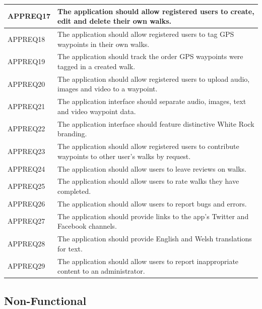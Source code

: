 \documentclass[11pt,a4paper]{article}
\begin{document}
\begin{longtable}{|p{2.5cm}p{13cm}|}
APPREQ17 & The application should allow registered users to create, edit and delete their own walks. \\ \hline
APPREQ18 & The application should allow registered users to tag GPS waypoints in their own walks. \\ \hline
APPREQ19 & The application should track the order GPS waypoints were tagged in a created walk. \\ \hline
APPREQ20 & The application should allow registered users to upload audio, images and video to a waypoint. \\ \hline
APPREQ21 & The application interface should separate audio, images, text and video waypoint data. \\ \hline
APPREQ22 & The application interface should feature distinctive White Rock branding. \\ \hline
APPREQ23 & The application should allow registered users to contribute waypoints to other user's walks by request. \\ \hline
APPREQ24 & The application should allow users to leave reviews on walks. \\ \hline
APPREQ25 & The application should allow users to rate walks they have completed. \\ \hline
APPREQ26 & The application should allow users to report bugs and errors. \\ \hline
APPREQ27 & The application should provide links to the app's Twitter and Facebook channels. \\ \hline
APPREQ28 & The application should provide English and Welsh translations for text. \\ \hline
APPREQ29 & The application should allow users to report inappropriate content to an administrator. \\ \hline

\end{longtable}

\subsection{Non-Functional}
\label{sec:non-func-reqs}
\end{document}
